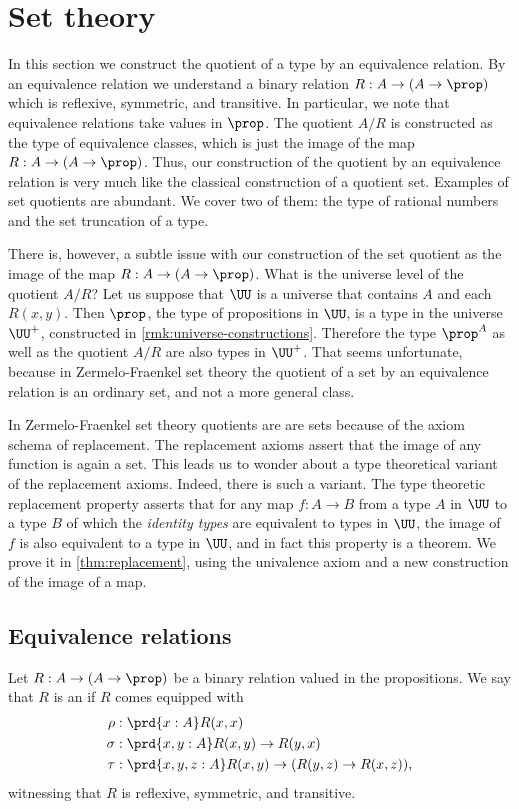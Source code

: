 \section{Set theory}

In this section we construct the quotient of a type by an equivalence relation. By an equivalence relation we understand a binary relation $R:A\to(A\to\prop)$ which is reflexive, symmetric, and transitive. In particular, we note that equivalence relations take values in $\prop$. The quotient $A/R$ is constructed as the type of equivalence classes, which is just the image of the map $R:A\to (A\to\prop)$. Thus, our construction of the quotient by an equivalence relation is very much like the classical construction of a quotient set. Examples of set quotients are abundant. We cover two of them: the type of rational numbers and the set truncation of a type.

There is, however, a subtle issue with our construction of the set quotient as the image of the map $R:A\to(A\to\prop)$. What is the universe level of the quotient $A/R$? Let us suppose that $\UU$ is a universe that contains $A$ and each $R(x,y)$. Then $\prop$, the type of propositions in $\UU$, is a type in the universe $\UU^+$, constructed in \cref{rmk:universe-constructions}. Therefore the type $\prop^A$ as well as the quotient $A/R$ are also types in $\UU^+$. That seems unfortunate, because in Zermelo-Fraenkel set theory the quotient of a set by an equivalence relation is an ordinary set, and not a more general class.

In Zermelo-Fraenkel set theory quotients are are sets because of the axiom schema of replacement. The replacement axioms assert that the image of any function is again a set. This leads us to wonder about a type theoretical variant of the replacement axioms. Indeed, there is such a variant. The type theoretic replacement property asserts that for any map $f:A\to B$ from a type $A$ in $\UU$ to a type $B$ of which the \emph{identity types} are equivalent to types in $\UU$, the image of $f$ is also equivalent to a type in $\UU$, and in fact this property is a theorem. We prove it in \cref{thm:replacement}, using the univalence axiom and a new construction of the image of a map.

\subsection{Equivalence relations}

\begin{defn}\label{defn:eq_rel}
Let $R:A\to (A\to\prop)$ be a binary relation valued in the propositions. We say that $R$ is an  if $R$ comes equipped with
\begin{align*}
\rho & : \prd{x:A}R(x,x) \\
\sigma & : \prd{x,y:A} R(x,y)\to R(y,x) \\
\tau & : \prd{x,y,z:A} R(x,y)\to (R(y,z)\to R(x,z)),
\end{align*}
witnessing that $R$ is reflexive, symmetric, and transitive.
\end{defn}

